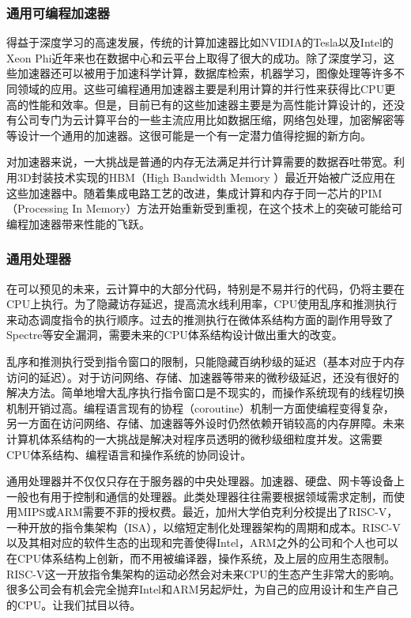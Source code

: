\subsubsection{通用可编程加速器}

得益于深度学习的高速发展，传统的计算加速器比如NVIDIA的Tesla以及Intel的Xeon Phi近年来也在数据中心和云平台上取得了很大的成功。除了深度学习，这些加速器还可以被用于加速科学计算，数据库检索，机器学习，图像处理等许多不同领域的应用。这些可编程通用加速器主要是利用计算的并行性来获得比CPU更高的性能和效率。但是，目前已有的这些加速器主要是为高性能计算设计的，还没有公司专门为云计算平台的一些主流应用比如数据压缩，网络包处理，加密解密等等设计一个通用的加速器。这很可能是一个有一定潜力值得挖掘的新方向。

对加速器来说，一大挑战是普通的内存无法满足并行计算需要的数据吞吐带宽。利用3D封装技术实现的HBM（High Bandwidth Memory ）最近开始被广泛应用在这些加速器中。随着集成电路工艺的改进，集成计算和内存于同一芯片的PIM（Processing In Memory）方法开始重新受到重视，在这个技术上的突破可能给可编程加速器带来性能的飞跃。

\subsubsection{通用处理器}

在可以预见的未来，云计算中的大部分代码，特别是不易并行的代码，仍将主要在CPU上执行。为了隐藏访存延迟，提高流水线利用率，CPU使用乱序和推测执行来动态调度指令的执行顺序。过去的推测执行在微体系结构方面的副作用导致了Spectre等安全漏洞，需要未来的CPU体系结构设计做出重大的改变。

乱序和推测执行受到指令窗口的限制，只能隐藏百纳秒级的延迟（基本对应于内存访问的延迟）。对于访问网络、存储、加速器等带来的微秒级延迟，还没有很好的解决方法。简单地增大乱序执行指令窗口是不现实的，而操作系统现有的线程切换机制开销过高。编程语言现有的协程（coroutine）机制一方面使编程变得复杂，另一方面在访问网络、存储、加速器等外设时仍然依赖开销较高的内存屏障。未来计算机体系结构的一大挑战是解决对程序员透明的微秒级细粒度并发。这需要CPU体系结构、编程语言和操作系统的协同设计。

通用处理器并不仅仅只存在于服务器的中央处理器。加速器、硬盘、网卡等设备上一般也有用于控制和通信的处理器。此类处理器往往需要根据领域需求定制，而使用MIPS或ARM需要不菲的授权费。最近，加州大学伯克利分校提出了RISC-V，一种开放的指令集架构（ISA），以缩短定制化处理器架构的周期和成本。RISC-V以及其相对应的软件生态的出现和完善使得Intel，ARM之外的公司和个人也可以在CPU体系结构上创新，而不用被编译器，操作系统，及上层的应用生态限制。RISC-V这一开放指令集架构的运动必然会对未来CPU的生态产生非常大的影响。很多公司会有机会完全抛弃Intel和ARM另起炉灶，为自己的应用设计和生产自己的CPU。让我们拭目以待。

